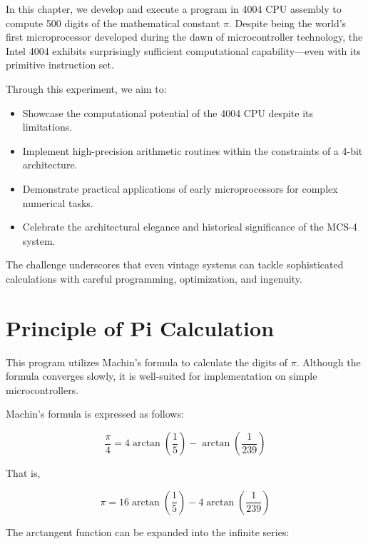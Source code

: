In this chapter, we develop and execute a program in 4004 CPU assembly to compute 500 digits of the mathematical constant $\pi$. Despite being the world's first microprocessor developed during the dawn of microcontroller technology, the Intel 4004 exhibits surprisingly sufficient computational capability—even with its primitive instruction set.

Through this experiment, we aim to:
\begin{itemize}
  \item Showcase the computational potential of the 4004 CPU despite its limitations.
  \item Implement high-precision arithmetic routines within the constraints of a 4-bit architecture.
  \item Demonstrate practical applications of early microprocessors for complex numerical tasks.
  \item Celebrate the architectural elegance and historical significance of the MCS-4 system.
\end{itemize}

The challenge underscores that even vintage systems can tackle sophisticated calculations with careful programming, optimization, and ingenuity.

\section{Principle of Pi Calculation}

This program utilizes Machin's formula to calculate the digits of $\pi$. Although the formula converges slowly, it is well-suited for implementation on simple microcontrollers.

Machin's formula is expressed as follows:


\begin{equation}
\frac{\pi}{4} = 4\arctan\left(\frac{1}{5}\right) - \arctan\left(\frac{1}{239}\right)
\end{equation}


That is,


\begin{equation}
\pi = 16\arctan\left(\frac{1}{5}\right) - 4\arctan\left(\frac{1}{239}\right)
\end{equation}



The arctangent function can be expanded into the infinite series:


